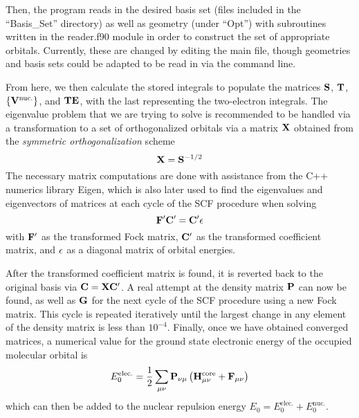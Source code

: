 \documentclass[%
 aip,
 amsmath,amssymb,
 reprint,%
]{revtex4-1}
\begin{document}
Then, the program reads in the desired basis set (files included in the
``Basis\_Set'' directory) as well as geometry (under ``Opt'') with subroutines
written in the {\code reader.f90} module in order to construct the set of
appropriate orbitals. Currently, these are changed by editing the main file,
though geometries and basis sets could be adapted to be read in via the
command line.

From here, we then calculate the stored integrals to populate the matrices 
$\bold{S}$, $\bold{T}$, $\left\{\bold{V}^{\text{nuc.}}\right\}$, and $\bold{TE}$,
with the last representing the two-electron integrals. The eigenvalue problem
that we are trying to solve is recommended to be handled via a transformation
to a set of orthogonalized orbitals via a matrix $\bold{X}$ obtained from 
the \emph{symmetric orthogonalization} scheme
%
\begin{equation}
\bold{X} = \bold{S}^{-1/2}
\end{equation}
%
The necessary matrix computations are done with assistance from the C++
numerics library Eigen\cite{eigenweb}, which is also later used to find the 
eigenvalues and eigenvectors of matrices at each cycle of the SCF procedure
when solving 
\begin{equation}
\bold{F}'\bold{C}' = \bold{C'}\bold{\epsilon}
\end{equation}
with $\bold{F}'$ as the transformed Fock matrix, 
$\bold{C}'$ as the transformed coefficient matrix, and $\bold{\epsilon}$ as a
diagonal matrix of orbital energies.

After the transformed coefficient matrix is found, it is reverted back to the
original basis via $\bold{C} = \bold{X}\bold{C}'$. A real attempt at the density
matrix $\bold{P}$ can now be found, as well as $\bold{G}$ for the next cycle
of the SCF procedure using a new Fock matrix.  This cycle is repeated
iteratively until the largest change in any element of the density matrix is
less than $10^{-4}$.  Finally, once we have obtained converged matrices, a
numerical value for the ground state electronic energy of the occupied
molecular orbital is
\begin{equation}
E_0^{\text{elec.}} = \frac{1}{2} \sum_{\mu\nu} \bold{P}_{\nu\mu} \left(
\bold{H}_{\mu\nu}^{\text{core}} + \bold{F}_{\mu\nu} \right)
\end{equation}
which can then be added to the nuclear repulsion energy 
$E_0 = E_0^{\text{elec.}} + E_0^{\text{nuc.}}$.
\end{document}
